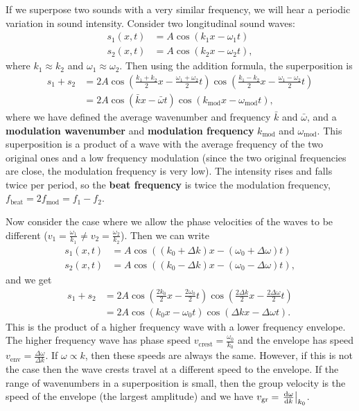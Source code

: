 \documentclass[../classical_mechanics.tex]{subfiles}
\begin{document}
        If we superpose two sounds with a very similar frequency, we will hear a periodic variation in sound intensity.
        Consider two longitudinal sound waves:
        \begin{align}
            s_1(x,t)&=A\cos(k_1x-\omega_1t)\\
            s_2(x,t)&=A\cos(k_2x-\omega_2t),
        \end{align}
        where $k_1\approx k_2$ and $\omega_1\approx\omega_2$.
        Then using the addition formula, the superposition is
        \begin{align}
            s_1+s_2&=2A\cos\left(\frac{k_1+k_2}{2}x-\frac{\omega_1+\omega_2}{2}t\right)\cos\left(\frac{k_1-k_2}{2}x-\frac{\omega_1-\omega_2}{2}t\right)\\
            &=2A\cos(\bar{k}x-\bar{\omega}t)\cos(k_\text{mod}x-\omega_\text{mod}t),
        \end{align}
        where we have defined the average wavenumber and frequency $\bar{k}$ and $\bar{\omega}$, and a \textbf{modulation wavenumber} and \textbf{modulation frequency} $k_\text{mod}$ and $\omega_\text{mod}$.
        This superposition is a product of a wave with the average frequency of the two original ones and a low frequency modulation (since the two original frequencies are close, the modulation frequency is very low).
        The intensity rises and falls twice per period, so the \textbf{beat frequency} is twice the modulation frequency, $f_\text{beat}=2f_\text{mod}=f_1-f_2$.

        Now consider the case where we allow the phase velocities of the waves to be different ($v_1=\frac{\omega_1}{k_1}\neq v_2=\frac{\omega_2}{k_2}$).
        Then we can write
        \begin{align}
            s_1(x,t)&=A\cos((k_0+\Delta k)x-(\omega_0+\Delta\omega)t)\\
            s_2(x,t)&=A\cos((k_0-\Delta k)x-(\omega_0-\Delta\omega)t),
        \end{align}
        and we get
        \begin{align}
            s_1+s_2&=2A\cos\left(\frac{2k_0}{2}x-\frac{2\omega_0}{2}t\right)\cos\left(\frac{2\Delta k}{2}x-\frac{2\Delta\omega}{2}t\right)\\
            &=2A\cos(k_0x-\omega_0t)\cos(\Delta kx-\Delta\omega t).
        \end{align}
        This is the product of a higher frequency wave with a lower frequency envelope.
        The higher frequency wave has phase speed $v_\text{crest}=\frac{\omega_0}{k_0}$ and the envelope has speed $v_\text{env}=\frac{\Delta\omega}{\Delta k}$.
        If $\omega\propto k$, then these speeds are always the same.
        However, if this is not the case then the wave crests travel at a different speed to the envelope.
        If the range of wavenumbers in a superposition is small, then the group velocity is the speed of the envelope (the largest amplitude) and we have $v_\text{gr}=\left.\dv{\omega}{k}\right|_{k_0}$.
        
\end{document}
